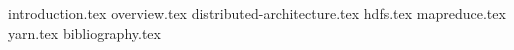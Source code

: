 \documentclass[a4paper,10pt]{report}
\begin{document}
 
 
 
 

{introduction.tex}
{overview.tex}
{distributed-architecture.tex}
{hdfs.tex}
{mapreduce.tex}
{yarn.tex}
{bibliography.tex}
 
\end{document}
